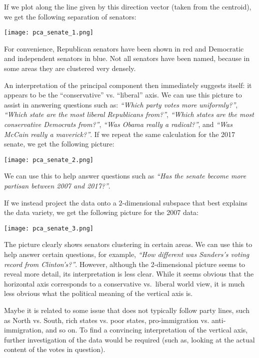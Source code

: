 \documentclass{ximera}
\begin{document}
If we plot along the line given by this direction vector (taken from the centroid), we get the following separation of senators:

\begin{center}
  \texttt{[image: pca\_senate\_1.png]}
\end{center}

For convenience, Republican senators have been shown in red and
Democratic and independent senators in blue. Not all senators have
been named, because in some areas they are clustered very densely. 

An
interpretation of the principal component then immediately suggests
itself: it appears to be the ``conservative'' vs. ``liberal'' axis. We
can use this picture to assist in answering questions such as: {\em
  ``Which party votes more uniformly?''}, {\em ``Which state are the
  most liberal Republicans from?''}, {\em ``Which states are the most
  conservative Democrats from?''}, {\em ``Was Obama really a
  radical?''}, and {\em ``Was McCain really a maverick?''}.  If we
repeat the same calculation for the 2017 senate, we get the following
picture:

\begin{center}
  \texttt{[image: pca\_senate\_2.png]}
\end{center}

We can use this to help answer questions such as {\em ``Has the senate
  become more partisan between 2007 and 2017?''}.

If we instead project the data onto a $2$-dimensional subspace that best explains the data variety, we get the following picture for the 2007 data:

\begin{center}
  \texttt{[image: pca\_senate\_3.png]}
\end{center}

The picture clearly shows senators clustering in certain areas. We can
use this to help answer certain questions, for example, {\em ``How
  different was Sanders's voting record from Clinton's?''}. However,
although the 2-dimensional picture seems to reveal more detail, its
interpretation is less clear. While it seems obvious that the
horizontal axis corresponds to a conservative vs.\ liberal world view,
it is much less obvious what the political meaning of the vertical
axis is. 

Maybe it is related to some issue that does not typically
follow party lines, such as North vs. South, rich states vs. poor
states, pro-immigration vs. anti-immigration, and so on.  To find a
convincing interpretation of the vertical axis, further investigation
of the data would be required (such as, looking at the actual content
of the votes in question).
\end{document}
